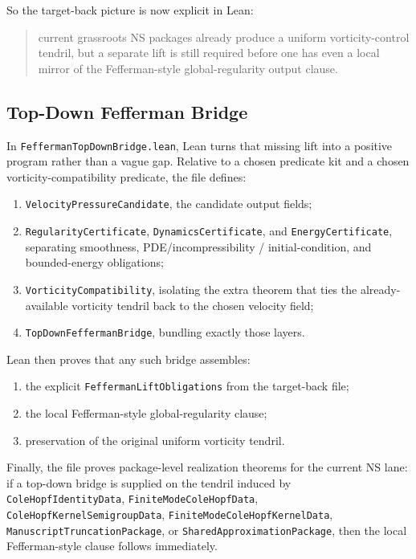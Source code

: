 \documentclass[11pt]{article}
\begin{document}
So the target-back picture is now explicit in Lean:
\begin{quote}
current grassroots NS packages already produce a uniform vorticity-control
tendril, but a separate lift is still required before one has even a local
mirror of the Fefferman-style global-regularity output clause.
\end{quote}

\subsection{Top-Down Fefferman Bridge}

In \texttt{FeffermanTopDownBridge.lean}, Lean turns that missing lift into a
positive program rather than a vague gap.  Relative to a chosen predicate kit
and a chosen vorticity-compatibility predicate, the file defines:
\begin{enumerate}[leftmargin=1.5em]
  \item \texttt{VelocityPressureCandidate}, the candidate output fields;
  \item \texttt{RegularityCertificate}, \texttt{DynamicsCertificate}, and
  \texttt{EnergyCertificate}, separating smoothness, PDE/incompressibility /
  initial-condition, and bounded-energy obligations;
  \item \texttt{VorticityCompatibility}, isolating the extra theorem that ties
  the already-available vorticity tendril back to the chosen velocity field;
  \item \texttt{TopDownFeffermanBridge}, bundling exactly those layers.
\end{enumerate}

Lean then proves that any such bridge assembles:
\begin{enumerate}[leftmargin=1.5em]
  \item the explicit \texttt{FeffermanLiftObligations} from the target-back
  file;
  \item the local Fefferman-style global-regularity clause;
  \item preservation of the original uniform vorticity tendril.
\end{enumerate}

Finally, the file proves package-level realization theorems for the current NS
lane: if a top-down bridge is supplied on the tendril induced by
\texttt{ColeHopfIdentityData}, \texttt{FiniteModeColeHopfData},
\texttt{ColeHopfKernelSemigroupData}, \texttt{FiniteModeColeHopfKernelData},
\texttt{ManuscriptTruncationPackage}, or \texttt{SharedApproximationPackage},
then the local Fefferman-style clause follows immediately.
\end{document}
